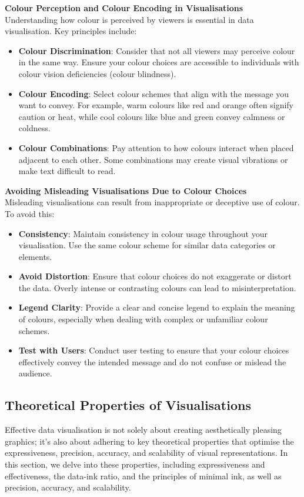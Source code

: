 \documentclass{article}\usepackage[]{graphicx}\usepackage[]{xcolor}
\begin{document}
\textbf{Colour Perception and Colour Encoding in Visualisations}\\
Understanding how colour is perceived by viewers is essential in data visualisation. Key principles include:
\begin{itemize}
    \item \textbf{Colour Discrimination}: Consider that not all viewers may perceive colour in the same way. Ensure your colour choices are accessible to individuals with colour vision deficiencies (colour blindness).
    \item \textbf{Colour Encoding}: Select colour schemes that align with the message you want to convey. For example, warm colours like red and orange often signify caution or heat, while cool colours like blue and green convey calmness or coldness.
    \item \textbf{Colour Combinations}: Pay attention to how colours interact when placed adjacent to each other. Some combinations may create visual vibrations or make text difficult to read.
\end{itemize}

\textbf{Avoiding Misleading Visualisations Due to Colour Choices}\\
Misleading visualisations can result from inappropriate or deceptive use of colour. To avoid this:
\begin{itemize}
    \item \textbf{Consistency}: Maintain consistency in colour usage throughout your visualisation. Use the same colour scheme for similar data categories or elements.
    \item \textbf{Avoid Distortion}: Ensure that colour choices do not exaggerate or distort the data. Overly intense or contrasting colours can lead to misinterpretation.
    \item \textbf{Legend Clarity}:  Provide a clear and concise legend to explain the meaning of colours, especially when dealing with complex or unfamiliar colour schemes. 
    \item \textbf{Test with Users}: Conduct user testing to ensure that your colour choices effectively convey the intended message and do not confuse or mislead the audience.
\end{itemize}

\subsection{Theoretical Properties of Visualisations}
Effective data visualisation is not solely about creating aesthetically pleasing graphics; it's also about adhering to key theoretical properties that optimise the expressiveness, precision, accuracy, and scalability of visual representations. In this section, we delve into these properties, including expressiveness and effectiveness, the data-ink ratio, and the principles of minimal ink, as well as precision, accuracy, and scalability.\\
\end{document}

